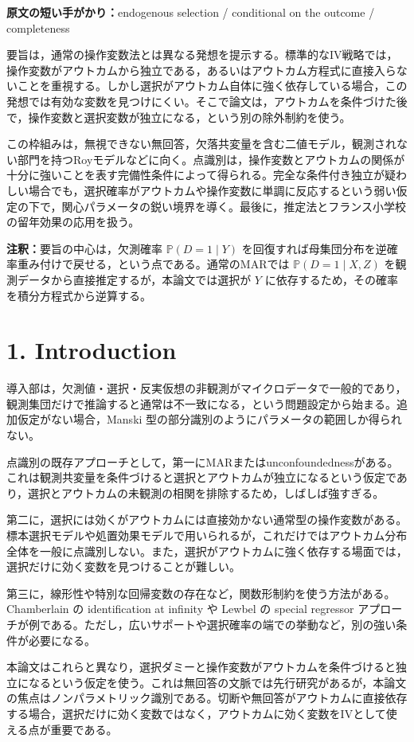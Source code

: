 \documentclass[10pt,a4paper]{article}
\newcommand{\Prb}{\mathbb{P}}
\newcommand{\note}[1]{\par\smallskip\noindent\textbf{注釈：}#1\par\smallskip}
\newcommand{\cue}[1]{\par\smallskip\noindent\textbf{原文の短い手がかり：}#1\par\smallskip}
\begin{document}
\cue{endogenous selection / conditional on the outcome / completeness}

要旨は，通常の操作変数法とは異なる発想を提示する。標準的なIV戦略では，操作変数がアウトカムから独立である，あるいはアウトカム方程式に直接入らないことを重視する。しかし選択がアウトカム自体に強く依存している場合，この発想では有効な変数を見つけにくい。そこで論文は，アウトカムを条件づけた後で，操作変数と選択変数が独立になる，という別の除外制約を使う。

この枠組みは，無視できない無回答，欠落共変量を含む二値モデル，観測されない部門を持つRoyモデルなどに向く。点識別は，操作変数とアウトカムの関係が十分に強いことを表す完備性条件によって得られる。完全な条件付き独立が疑わしい場合でも，選択確率がアウトカムや操作変数に単調に反応するという弱い仮定の下で，関心パラメータの鋭い境界を導く。最後に，推定法とフランス小学校の留年効果の応用を扱う。

\note{要旨の中心は，欠測確率 $\Prb(D=1\mid Y)$ を回復すれば母集団分布を逆確率重み付けで戻せる，という点である。通常のMARでは $\Prb(D=1\mid X,Z)$ を観測データから直接推定するが，本論文では選択が $Y$ に依存するため，その確率を積分方程式から逆算する。}

\section{1. Introduction}

導入部は，欠測値・選択・反実仮想の非観測がマイクロデータで一般的であり，観測集団だけで推論すると通常は不一致になる，という問題設定から始まる。追加仮定がない場合，Manski 型の部分識別のようにパラメータの範囲しか得られない。

点識別の既存アプローチとして，第一にMARまたはunconfoundednessがある。これは観測共変量を条件づけると選択とアウトカムが独立になるという仮定であり，選択とアウトカムの未観測の相関を排除するため，しばしば強すぎる。

第二に，選択には効くがアウトカムには直接効かない通常型の操作変数がある。標本選択モデルや処置効果モデルで用いられるが，これだけではアウトカム分布全体を一般に点識別しない。また，選択がアウトカムに強く依存する場面では，選択だけに効く変数を見つけることが難しい。

第三に，線形性や特別な回帰変数の存在など，関数形制約を使う方法がある。Chamberlain の identification at infinity や Lewbel の special regressor アプローチが例である。ただし，広いサポートや選択確率の端での挙動など，別の強い条件が必要になる。

本論文はこれらと異なり，選択ダミーと操作変数がアウトカムを条件づけると独立になるという仮定を使う。これは無回答の文脈では先行研究があるが，本論文の焦点はノンパラメトリック識別である。切断や無回答がアウトカムに直接依存する場合，選択だけに効く変数ではなく，アウトカムに効く変数をIVとして使える点が重要である。
\end{document}
